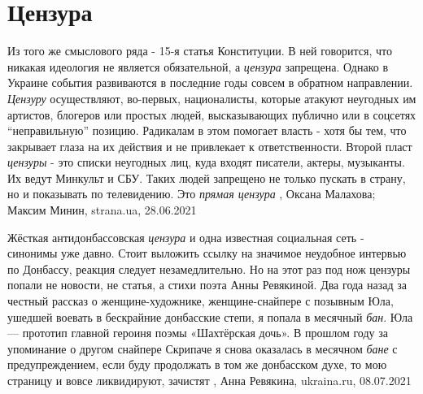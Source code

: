  
 
 
 
 
\chapter{Цензура}
\label{sec:slova.cenzura}

Из того же смыслового ряда - 15-я статья Конституции. В ней говорится, что
никакая идеология не является обязательной, а \emph{цензура} запрещена.
Однако в Украине события развиваются в последние годы совсем в обратном
направлении.
\emph{Цензуру} осуществляют, во-первых, националисты, которые атакуют неугодных им
артистов, блогеров или простых людей, высказывающих публично или в соцсетях
\enquote{неправильную} позицию. Радикалам в этом помогает власть - хотя бы тем, что
закрывает глаза на их действия и не привлекает к ответственности.
Второй пласт \emph{цензуры} - это списки неугодных лиц, куда входят писатели, актеры,
музыканты. Их ведут Минкульт и СБУ. Таких людей запрещено не только пускать в
страну, но и показывать по телевидению. Это \emph{прямая цензура}
, 
Оксана Малахова; Максим Минин, strana.ua, 28.06.2021

Жёсткая антидонбассовская \emph{цензура} и одна известная социальная сеть -
синонимы уже давно. Стоит выложить ссылку на значимое неудобное интервью по
Донбассу, реакция следует незамедлительно. Но на этот раз под нож цензуры
попали не новости, не статья, а стихи поэта Анны Ревякиной. Два года назад за
честный рассказ о женщине-художнике, женщине-снайпере с позывным Юла, ушедшей
воевать в бескрайние донбасские степи, я попала в месячный \emph{бан}. Юла — прототип
главной героиня поэмы «Шахтёрская дочь». В прошлом году за упоминание о другом
снайпере Скрипаче я снова оказалась в месячном \emph{бане} с предупреждением, если
буду продолжать в том же донбасском духе, то мою страницу и вовсе ликвидируют,
зачистят
, Анна Ревякина, ukraina.ru, 08.07.2021


